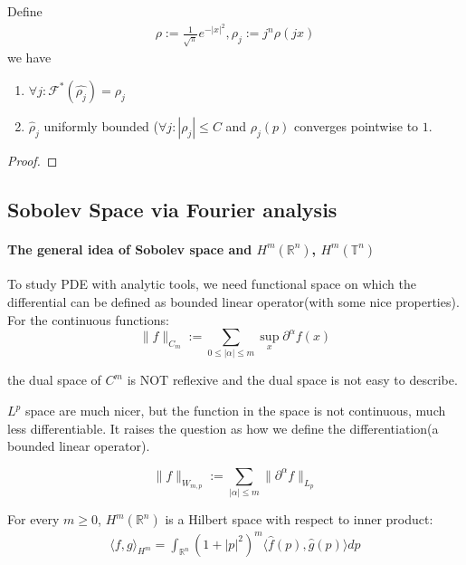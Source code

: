 \begin{lemma}
	Define
	\begin{align*}
		\rho:= \frac{1}{\sqrt{\pi}} e^{-|x|^2}, \rho_j:= j^n \rho(jx)
	\end{align*}
	we have
	\begin{enumerate}
		\item $\forall j: \mathcal {F}^*(\hat{\rho_j}) = \rho_j$
		\item $\hat{\rho}_j$ uniformly bounded ($\forall j:|\rho_j| \le C$ and $\rho_j(p)$ converges pointwise to $1$. 
	\end{enumerate}
\end{lemma}
\begin{proof}
\end{proof}



\subsection{Sobolev Space via Fourier analysis}
\paragraph{The general idea of Sobolev space and $H^m(\mathbb{R}^n)$, $H^m(\mathbb{T}^n)$} 
\quad\par
To study PDE with analytic tools, we need functional space on which the differential can be defined as bounded linear operator(with some nice properties). For the continuous functions:  
\begin{equation*}
	\|f\|_{C_m} := \sum_{0 \leq |\alpha| \leq m} \sup_x \partial^\alpha f(x)
\end{equation*}
\begin{remark}
the dual space of $C^m$ is NOT reflexive and the dual space is not easy to describe.	
\end{remark}

$L^p$ space are much nicer, but the function in the space is not continuous, much less differentiable. It raises the question as how we define the differentiation(a bounded linear operator).

\begin{definition}
	\begin{equation*}
		\|f\|_{W_{m, p}} := \sum_{|\alpha| \leq m } \|\partial^\alpha f\|_{L_p}
	\end{equation*}
\end{definition}

\begin{theorem}
	For every $m \geq 0$, $H^m(\mathbb{R}^n)$ is a Hilbert space with respect to inner product:
	\begin{align*}
		\langle f, g \rangle_{H^m} = \int_{\mathbb{R}^n}( 1 + |p|^2)^m
		\langle \hat{f}(p), \hat{g}(p) \rangle dp
	\end{align*}
\end{theorem}

